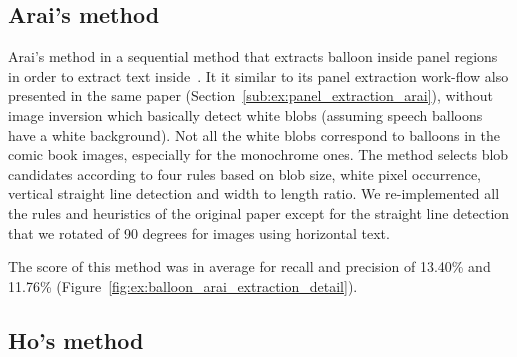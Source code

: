 

\subsection{Arai's method} %
\label{sub:ex:balloon_extraction_arai}

Arai's method in a sequential method that extracts balloon inside panel regions in order to extract text inside~\cite{Arai11}.
It it similar to its panel extraction work-flow also presented in the same paper (Section~\ref{sub:ex:panel_extraction_arai}), without image inversion which basically detect white blobs (assuming speech balloons have a white background).
Not all the white blobs correspond to balloons in the comic book images, especially for the monochrome ones.
The method selects blob candidates according to four rules based on blob size, white pixel occurrence, vertical straight line detection and width to length ratio.
We re-implemented all the rules and heuristics of the original paper except for the straight line detection that we rotated of 90 degrees for images using horizontal text.

The score of this method  was in average for recall and precision of 13.40\% and 11.76\% (Figure~\ref{fig:ex:balloon_arai_extraction_detail}).



\subsection{Ho's method~\cite{Ho2012}} %

